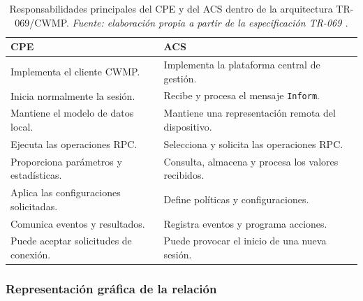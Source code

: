 \begin{table}[H]
    \centering
    \small
    \renewcommand{\arraystretch}{1.35}

    \caption[Responsabilidades del CPE y del ACS.]
    {Responsabilidades principales del CPE y del ACS dentro de la
    arquitectura TR-069/CWMP.
    \textit{Fuente: elaboración propia a partir de la especificación
    TR-069 \cite{bbf_tr069}.}}

    \label{tab:responsabilidades-cpe-acs}

    \begin{tabular}{
        p{}
        p{}
    }
        \hline
        \textbf{CPE}
        &
        \textbf{ACS}
        \\
        \hline

        Implementa el cliente CWMP.
        &
        Implementa la plataforma central de gestión.
        \\

        Inicia normalmente la sesión.
        &
        Recibe y procesa el mensaje \texttt{Inform}.
        \\

        Mantiene el modelo de datos local.
        &
        Mantiene una representación remota del dispositivo.
        \\

        Ejecuta las operaciones RPC.
        &
        Selecciona y solicita las operaciones RPC.
        \\

        Proporciona parámetros y estadísticas.
        &
        Consulta, almacena y procesa los valores recibidos.
        \\

        Aplica las configuraciones solicitadas.
        &
        Define políticas y configuraciones.
        \\

        Comunica eventos y resultados.
        &
        Registra eventos y programa acciones.
        \\

        Puede aceptar solicitudes de conexión.
        &
        Puede provocar el inicio de una nueva sesión.
        \\

        \hline
    \end{tabular}
\end{table}

\subsubsection*{Representación gráfica de la relación}

